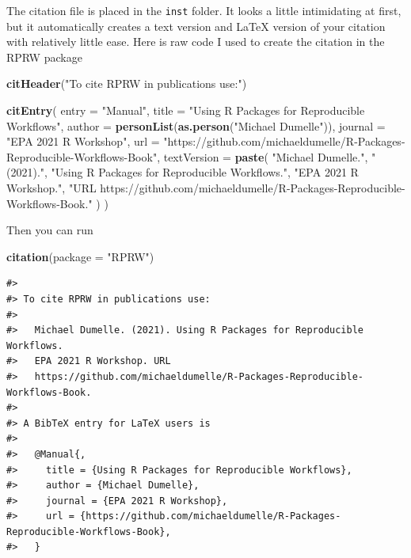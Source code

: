 \documentclass[
]{book}
\newenvironment{Shaded}{\begin{snugshade}}{\end{snugshade}}
\newcommand{\DataTypeTok}[1]{\textcolor[rgb]{0.13,0.29,0.53}{#1}}
\newcommand{\KeywordTok}[1]{\textcolor[rgb]{0.13,0.29,0.53}{\textbf{#1}}}
\newcommand{\NormalTok}[1]{#1}
\newcommand{\StringTok}[1]{\textcolor[rgb]{0.31,0.60,0.02}{#1}}
\begin{document}
The citation file is placed in the \texttt{inst} folder. It looks a little intimidating at first, but it automatically creates a text version and LaTeX version of your citation with relatively little ease. Here is raw code I used to create the citation in the RPRW package

\begin{Shaded}
\begin{Highlighting}[]
\KeywordTok{citHeader}\NormalTok{(}\StringTok{"To cite RPRW in publications use:"}\NormalTok{)}

\KeywordTok{citEntry}\NormalTok{(}
  \DataTypeTok{entry    =} \StringTok{"Manual"}\NormalTok{,}
  \DataTypeTok{title    =} \StringTok{"Using R Packages for Reproducible Workflows"}\NormalTok{,}
  \DataTypeTok{author   =} \KeywordTok{personList}\NormalTok{(}\KeywordTok{as.person}\NormalTok{(}\StringTok{"Michael Dumelle"}\NormalTok{)),}
  \DataTypeTok{journal  =} \StringTok{"EPA 2021 R Workshop"}\NormalTok{,}
  \DataTypeTok{url      =} \StringTok{"https://github.com/michaeldumelle/R-Packages-Reproducible-Workflows-Book"}\NormalTok{,}
  \DataTypeTok{textVersion =}
  \KeywordTok{paste}\NormalTok{(}
    \StringTok{"Michael Dumelle."}\NormalTok{,}
    \StringTok{"(2021)."}\NormalTok{,}
    \StringTok{"Using R Packages for Reproducible Workflows."}\NormalTok{,}
    \StringTok{"EPA 2021 R Workshop."}\NormalTok{,}
    \StringTok{"URL https://github.com/michaeldumelle/R-Packages-Reproducible-Workflows-Book."}
\NormalTok{  )}
\NormalTok{)}
\end{Highlighting}
\end{Shaded}

Then you can run

\begin{Shaded}
\begin{Highlighting}[]
\KeywordTok{citation}\NormalTok{(}\DataTypeTok{package =} \StringTok{"RPRW"}\NormalTok{)}
\end{Highlighting}
\end{Shaded}

\begin{verbatim}
#> 
#> To cite RPRW in publications use:
#> 
#>   Michael Dumelle. (2021). Using R Packages for Reproducible Workflows.
#>   EPA 2021 R Workshop. URL
#>   https://github.com/michaeldumelle/R-Packages-Reproducible-Workflows-Book.
#> 
#> A BibTeX entry for LaTeX users is
#> 
#>   @Manual{,
#>     title = {Using R Packages for Reproducible Workflows},
#>     author = {Michael Dumelle},
#>     journal = {EPA 2021 R Workshop},
#>     url = {https://github.com/michaeldumelle/R-Packages-Reproducible-Workflows-Book},
#>   }
\end{verbatim}
\end{document}
